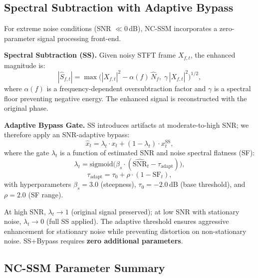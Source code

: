 \documentclass[journal]{IEEEtran}
\begin{document}
\subsection{Spectral Subtraction with Adaptive Bypass}
\label{sec:ss_bypass}

For extreme noise conditions (SNR $\ll 0$\,dB), NC-SSM incorporates a zero-parameter signal processing front-end.

\smallskip\noindent\textbf{Spectral Subtraction (SS).}
Given noisy STFT frame $X_{f,t}$, the enhanced magnitude is:
\begin{equation}
|\hat{S}_{f,t}| = \max\!\Big(|X_{f,t}|^2 - \alpha(f)\,\hat{N}_f,\; \gamma\,|X_{f,t}|^2\Big)^{1/2},
\label{eq:ss}
\end{equation}
where $\alpha(f)$ is a frequency-dependent oversubtraction factor and $\gamma$ is a spectral floor preventing negative energy.
The enhanced signal is reconstructed with the original phase.

\smallskip\noindent\textbf{Adaptive Bypass Gate.}
SS introduces artifacts at moderate-to-high SNR; we therefore apply an SNR-adaptive bypass:
\begin{equation}
\hat{x}_t = \lambda_t \cdot x_t + (1 - \lambda_t) \cdot x_t^{\text{SS}},
\label{eq:bypass}
\end{equation}
where the gate $\lambda_t$ is a function of estimated SNR and noise spectral flatness (SF):
\begin{equation}
\lambda_t = \text{sigmoid}\!\big(\beta_s \cdot (\widehat{\text{SNR}}_t - \tau_{\text{adapt}})\big),
\label{eq:bypass_gate}
\end{equation}
\begin{equation}
\tau_{\text{adapt}} = \tau_0 + \rho \cdot (1 - \text{SF}_t),
\label{eq:adaptive_threshold}
\end{equation}
with hyperparameters $\beta_s = 3.0$ (steepness), $\tau_0 = -2.0$\,dB (base threshold), and $\rho = 2.0$ (SF range).

At high SNR, $\lambda_t \to 1$ (original signal preserved); at low SNR with stationary noise, $\lambda_t \to 0$ (full SS applied).
The adaptive threshold ensures aggressive enhancement for stationary noise while preventing distortion on non-stationary noise.
SS+Bypass requires \textbf{zero additional parameters}.

\subsection{NC-SSM Parameter Summary}
\end{document}
